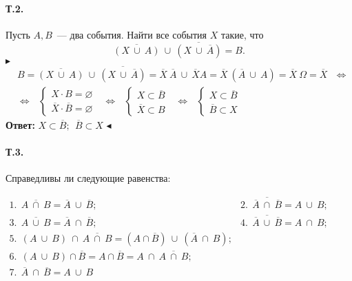 \documentclass[a4paper,12pt]{article} %
\newcommand{\tb}[1]{\textbf{#1}}
\newcommand{\ol}[1]{\ensuremath{\overline{#1}}}
\begin{document}
\paragraph{Т.2.} Пусть $ A, B $~--- два события. 
Найти все события $ X $ такие, что
\[
	\overline{(X~\cup~A)}~\cup~\overline{(X~\cup~\overline{A})}=B.
\]
$ \blacktriangleright $
\begin{align}&
	B=\overline{(X~\cup~A)}~\cup~\overline{(X~\cup~\overline{A})}=
	\ol{X}~\ol{A}~\cup~\ol{X}A=
	\ol{X}~(\ol{A}~\cup~A)=\ol{X}~\Omega=\ol{X}~~~\Longleftrightarrow\\
	&\Longleftrightarrow~~~
	\begin{cases}
		X\cdot B=\varnothing\\
		\ol{X}\cdot \ol{B}=\varnothing
	\end{cases}~~~\Longleftrightarrow~~~
	\begin{cases}
		X\subset\ol{B}\\
		\ol{X}\subset B
	\end{cases}~~~\Longleftrightarrow~~~
	\begin{cases}
		X\subset\ol{B}\\
		\ol{B}\subset X
	\end{cases}	
\end{align}
\tb{Ответ: }$ X\subset\ol{B};~~\ol{B}\subset X $
\hfill$ \blacktriangleleft $

\paragraph{Т.3.} Справедливы ли следующие равенства:

$\begin{array}{lc}
	1.~~\ol{A~\cap~B}=\ol{A}~\cup~\ol{B}; & 
	2.~~\ol{\ol{A}~\cap~\ol{B}}=A~\cup~B;\\
	3.~~\ol{A~\cup~B}=\ol{A}~\cap~\ol{B}; &
	4.~~\ol{\ol{A}~\cup~\ol{B}}=A~\cap~B;\\
	5.~~(A~\cup~B)~\cap~\ol{A~\cap~B}=
	(A\cap\ol{B})~\cup~(\ol{A}~\cap~B); &\\
	6.~~(A~\cup~B)\cap\ol{B}=A\cap\ol{B}=A~\cap~\ol{A~\cap~B}; &\\
	7.~~\ol{A}~\cap~\ol{B}=A~\cup~B
\end{array}$\\
\end{document}
